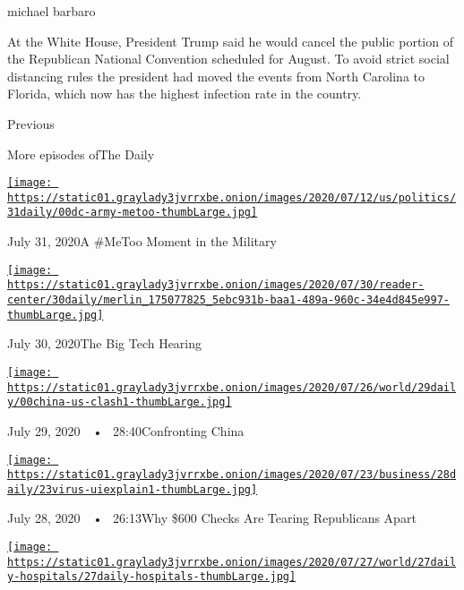 michael barbaro

At the White House, President Trump said he would cancel the public
portion of the Republican National Convention scheduled for August. To
avoid strict social distancing rules the president had moved the events
from North Carolina to Florida, which now has the highest infection rate
in the country.

Previous

More episodes ofThe Daily

\href{https://www.nytimes3xbfgragh.onion/2020/07/31/podcasts/the-daily/vanessa-guillen-military-metoo.html?action=click\&module=audio-series-bar\&region=header\&pgtype=Article}{\texttt{[image: https://static01.graylady3jvrrxbe.onion/images/2020/07/12/us/politics/31daily/00dc-army-metoo-thumbLarge.jpg]}}

July 31, 2020A \#MeToo Moment in the Military

\href{https://www.nytimes3xbfgragh.onion/2020/07/30/podcasts/the-daily/congress-facebook-amazon-google-apple.html?action=click\&module=audio-series-bar\&region=header\&pgtype=Article}{\texttt{[image: https://static01.graylady3jvrrxbe.onion/images/2020/07/30/reader-center/30daily/merlin\_175077825\_5ebc931b-baa1-489a-960c-34e4d845e997-thumbLarge.jpg]}}

July 30, 2020The Big Tech Hearing

\href{https://www.nytimes3xbfgragh.onion/2020/07/29/podcasts/the-daily/china-trump-foreign-policy.html?action=click\&module=audio-series-bar\&region=header\&pgtype=Article}{\texttt{[image: https://static01.graylady3jvrrxbe.onion/images/2020/07/26/world/29daily/00china-us-clash1-thumbLarge.jpg]}}

July 29, 2020~~•~ 28:40Confronting China

\href{https://www.nytimes3xbfgragh.onion/2020/07/28/podcasts/the-daily/unemployment-benefits-coronavirus.html?action=click\&module=audio-series-bar\&region=header\&pgtype=Article}{\texttt{[image: https://static01.graylady3jvrrxbe.onion/images/2020/07/23/business/28daily/23virus-uiexplain1-thumbLarge.jpg]}}

July 28, 2020~~•~ 26:13Why \$600 Checks Are Tearing Republicans Apart

\href{https://www.nytimes3xbfgragh.onion/2020/07/27/podcasts/the-daily/new-york-hospitals-covid.html?action=click\&module=audio-series-bar\&region=header\&pgtype=Article}{\texttt{[image: https://static01.graylady3jvrrxbe.onion/images/2020/07/27/world/27daily-hospitals/27daily-hospitals-thumbLarge.jpg]}}

